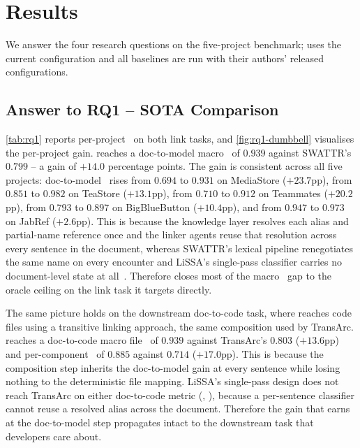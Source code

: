 \section{Results}
\label{sec:results}

We answer the four research questions on the five-project benchmark; \approach{} uses the current configuration and all baselines are run with their authors' released configurations.




\subsection{Answer to RQ1 -- SOTA Comparison}
\label{sec:results:rq1}




\autoref{tab:rq1} reports per-project \fone\ on both link tasks, and \autoref{fig:rq1-dumbbell} visualises the per-project gain.
\approach{} reaches a doc-to-model macro \fone\ of $0.939$ against SWATTR's $0.799$ -- a gain of $+14.0$ percentage points.
The gain is consistent across all five projects: doc-to-model \fone\ rises from $0.694$ to $0.931$ on MediaStore ($+23.7$pp), from $0.851$ to $0.982$ on TeaStore ($+13.1$pp), from $0.710$ to $0.912$ on Teammates ($+20.2$pp), from $0.793$ to $0.897$ on BigBlueButton ($+10.4$pp), and from $0.947$ to $0.973$ on JabRef ($+2.6$pp).
This is because the knowledge layer resolves each alias and partial-name reference once and the linker agents reuse that resolution across every sentence in the document, whereas SWATTR's lexical pipeline renegotiates the same name on every encounter and LiSSA's single-pass classifier carries no document-level state at all~.
Therefore \approach{} closes most of the macro \fone\ gap to the oracle ceiling on the link task it targets directly.

The same picture holds on the downstream doc-to-code task, where \approach{} reaches code files using a transitive linking approach, the same composition used by TransArc.
\approach{} reaches a doc-to-code macro file \fone\ of $0.939$ against TransArc's $0.803$ ($+13.6$pp) and per-component \fone\ of $0.885$ against $0.714$ ($+17.0$pp).
This is because the composition step inherits the doc-to-model gain at every sentence while losing nothing to the deterministic file mapping.
LiSSA's single-pass design does not reach TransArc on either doc-to-code metric (, ), because a per-sentence classifier cannot reuse a resolved alias across the document.
Therefore the gain that \approach{} earns at the doc-to-model step propagates intact to the downstream task that developers care about.

